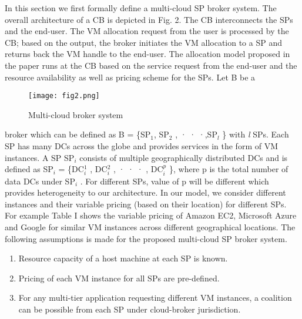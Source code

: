 \documentclass[conference]{IEEEtran}
\newcommand\tab[1][0.8cm]{\hspace*{#1}}
\begin{document}
\tab In this section we first formally define a multi-cloud SP
broker system. The overall architecture of a CB is depicted in
Fig. 2. The CB interconnects the SPs and the end-user. The
VM allocation request from the user is processed by the CB;
based on the output, the broker initiates the VM allocation to
a SP and returns back the VM handle to the end-user. The
allocation model proposed in the paper runs at the CB based
on the service request from the end-user and the resource
availability as well as pricing scheme for the SPs. Let B be a
\begin{figure}[htbp]
	\centerline{\texttt{[image: fig2.png]}}
	\caption{Multi-cloud broker system}
	\label{fig}
\end{figure}
\newline
broker which can be defined as B = \{SP${_{1}}$, SP${_{2}}$ , · · ·,SP${_{l}}$ \} with \emph{l} SPs. Each SP has many DCs across the globe and
provides services in the form of VM instances. A SP SP$_i$
consists of multiple geographically distributed DCs and is
defined as SP$_i$ = \{DC$^1_i$ , DC$^2_i$ , · · · , DC$^p_i$ \}, where p is the
total number of data DCs under SP$_i$ . For different SPs, value
of p will be different which provides heterogeneity to our architecture.  In our model, we
consider different instances and their variable pricing (based
on their location) for different SPs. For example Table I shows
the variable pricing of Amazon EC2, Microsoft Azure and
Google for similar VM instances across different geographical
locations. The following assumptions is made for the proposed
multi-cloud SP broker system.
\begin{enumerate}
	\item Resource capacity of a host machine at each SP is
	known.
	\item Pricing of each VM instance for all SPs are pre-defined.
	\item For any multi-tier application requesting different VM
	instances, a coalition can be possible from each SP under
	cloud-broker jurisdiction.
\end{enumerate}
\end{document}
